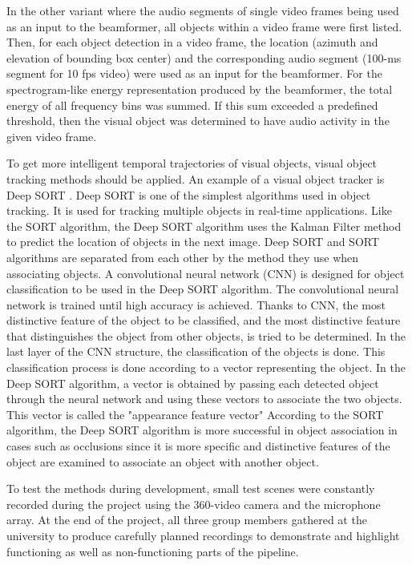 In the other variant where the audio segments of single video frames being used as an input to the beamformer, all objects within a video frame were first listed. Then, for each object detection in a video frame, the location (azimuth and elevation of bounding box center) and the corresponding audio segment (100-ms segment for 10 fps video) were used as an input for the beamformer. For the spectrogram-like energy representation produced by the beamformer, the total energy of all frequency bins was summed. If this sum exceeded a predefined threshold, then the visual object was determined to have audio activity in the given video frame.

To get more intelligent temporal trajectories of visual objects, visual object tracking methods should be applied. An example of a visual object tracker is Deep SORT \cite{deepsort}. Deep SORT is one of the simplest algorithms used in object tracking. It is used for tracking multiple objects in real-time applications. Like the SORT algorithm, the Deep SORT algorithm uses the Kalman Filter method to predict the location of objects in the next image. Deep SORT and SORT algorithms are separated from each other by the method they use when associating objects. A convolutional neural network (CNN) is designed for object classification to be used in the Deep SORT algorithm. The convolutional neural network is trained until high accuracy is achieved. Thanks to CNN, the most distinctive feature of the object to be classified, and the most distinctive feature that distinguishes the object from other objects, is tried to be determined. In the last layer of the CNN structure, the classification of the objects is done. This classification process is done according to a vector representing the object. In the Deep SORT algorithm, a vector is obtained by passing each detected object through the neural network and using these vectors to associate the two objects. This vector is called the "appearance feature vector" According to the SORT algorithm, the Deep SORT algorithm is more successful in object association in cases such as occlusions since it is more specific and distinctive features of the object are examined to associate an object with another object.

To test the methods during development, small test scenes were constantly recorded during the project using the 360-video camera and the microphone array. At the end of the project, all three group members gathered at the university to produce carefully planned recordings to demonstrate and highlight functioning as well as non-functioning parts of the pipeline.



